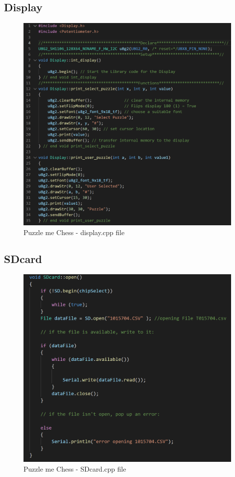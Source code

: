 \documentclass[11pt]{article}
\begin{document}
\subsection{Display}

\begin{figure}
  \includegraphics[width=\linewidth]{./Pics/Displaycpp.PNG}
  \caption{Puzzle me Chess - display.cpp file}
  \label{fig:Display}
\end{figure}

\subsection{SDcard}

\begin{figure}
  \includegraphics[width=\linewidth]{./Pics/sdcardpart3.PNG}
  \caption{Puzzle me Chess - SDcard.cpp file}
  \label{fig:sdcard1}
\end{figure}
\end{document}
